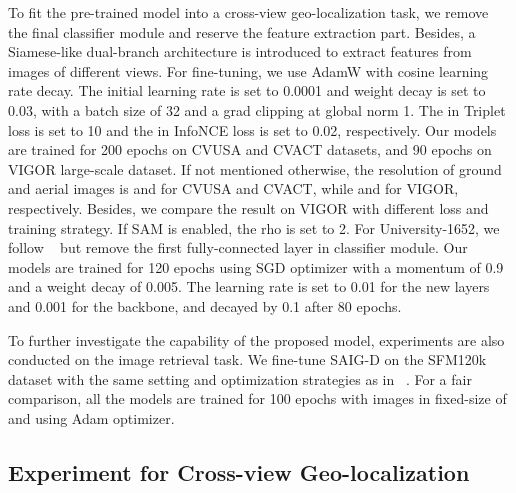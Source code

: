 \documentclass[sn-basic,iicol]{sn-jnl}
\theoremstyle{thmstyletwo}\newtheorem{example}{Example}\newtheorem{remark}{Remark}
\theoremstyle{thmstylethree}\newtheorem{definition}{Definition}
\begin{document}
 To fit the pre-trained model into a cross-view geo-localization task, we remove the final classifier module and reserve the feature extraction part. Besides, a Siamese-like dual-branch architecture is introduced to extract features from images of different views. For fine-tuning, we use AdamW with cosine learning rate decay. The initial learning rate is set to 0.0001 and weight decay is set to 0.03, with a batch size of 32 and a grad clipping at global norm 1. The  in Triplet loss is set to 10 and the  in InfoNCE loss is set to 0.02, respectively. Our models are trained for 200 epochs on CVUSA and CVACT datasets, and 90 epochs on VIGOR large-scale dataset. If not mentioned otherwise, the resolution of ground and aerial images is  and  for CVUSA and CVACT, while  and  for VIGOR, respectively. Besides, we compare the result on VIGOR with different loss and training strategy. If SAM is enabled, the rho is set to 2. For University-1652, we follow ~\citep{wang2021LPN} but remove the first fully-connected layer in classifier module. Our models are trained for 120 epochs using SGD optimizer with a momentum of 0.9 and a weight decay of 0.005. The learning rate is set to 0.01 for the new layers and 0.001 for the backbone, and decayed by 0.1 after 80 epochs. 


 To further investigate the capability of the proposed model, experiments are also conducted on the image retrieval task. We fine-tune SAIG-D on the SFM120k dataset with the same setting and optimization strategies as in ~\citep{TrainViTforImageRetri}. For a fair comparison, all the models are trained for 100 epochs with images in fixed-size of  and  using Adam optimizer. 

\subsection{Experiment for Cross-view Geo-localization}
\end{document}
